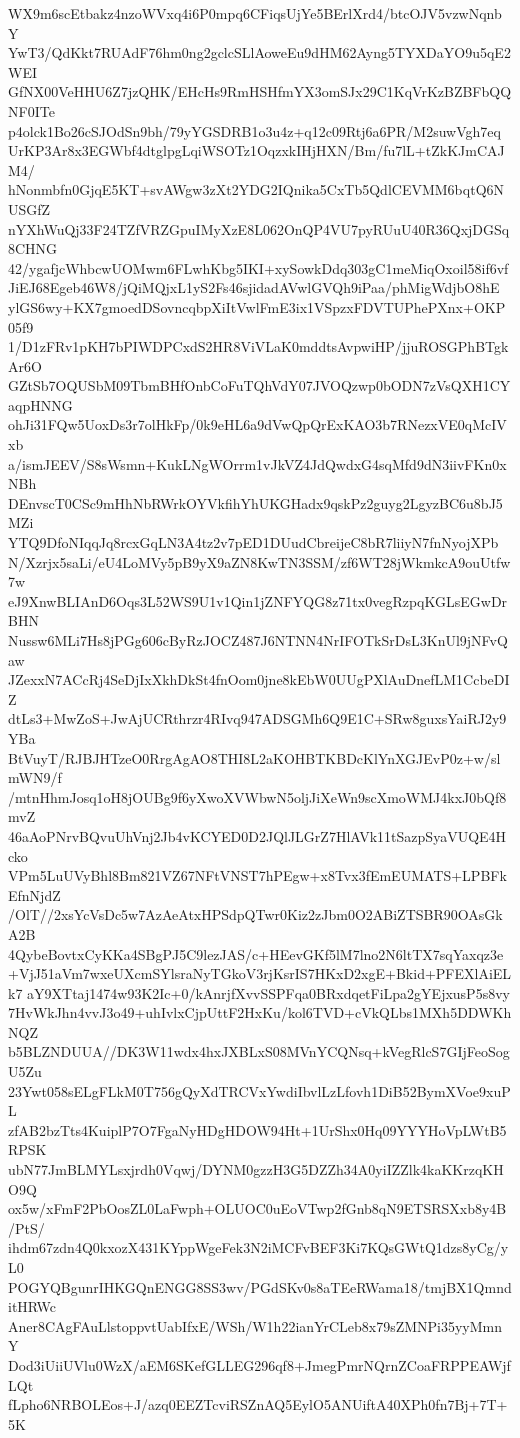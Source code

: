 WX9m6scEtbakz4nzoWVxq4i6P0mpq6CFiqsUjYe5BErlXrd4/btcOJV5vzwNqnbY
YwT3/QdKkt7RUAdF76hm0ng2gclcSLlAoweEu9dHM62Ayng5TYXDaYO9u5qE2WEI
GfNX00VeHHU6Z7jzQHK/EHcHs9RmHSHfmYX3omSJx29C1KqVrKzBZBFbQQNF0ITe
p4olck1Bo26cSJOdSn9bh/79yYGSDRB1o3u4z+q12c09Rtj6a6PR/M2suwVgh7eq
UrKP3Ar8x3EGWbf4dtglpgLqiWSOTz1OqzxkIHjHXN/Bm/fu7lL+tZkKJmCAJM4/
hNonmbfn0GjqE5KT+svAWgw3zXt2YDG2IQnika5CxTb5QdlCEVMM6bqtQ6NUSGfZ
nYXhWuQj33F24TZfVRZGpuIMyXzE8L062OnQP4VU7pyRUuU40R36QxjDGSq8CHNG
42/ygafjcWhbcwUOMwm6FLwhKbg5IKI+xySowkDdq303gC1meMiqOxoil58if6vf
JiEJ68Egeb46W8/jQiMQjxL1yS2Fs46sjidadAVwlGVQh9iPaa/phMigWdjbO8hE
ylGS6wy+KX7gmoedDSovncqbpXiItVwlFmE3ix1VSpzxFDVTUPhePXnx+OKP05f9
1/D1zFRv1pKH7bPIWDPCxdS2HR8ViVLaK0mddtsAvpwiHP/jjuROSGPhBTgkAr6O
GZtSb7OQUSbM09TbmBHfOnbCoFuTQhVdY07JVOQzwp0bODN7zVsQXH1CYaqpHNNG
ohJi31FQw5UoxDs3r7olHkFp/0k9eHL6a9dVwQpQrExKAO3b7RNezxVE0qMcIVxb
a/ismJEEV/S8sWsmn+KukLNgWOrrm1vJkVZ4JdQwdxG4sqMfd9dN3iivFKn0xNBh
DEnvscT0CSc9mHhNbRWrkOYVkfihYhUKGHadx9qskPz2guyg2LgyzBC6u8bJ5MZi
YTQ9DfoNIqqJq8rcxGqLN3A4tz2v7pED1DUudCbreijeC8bR7liiyN7fnNyojXPb
N/Xzrjx5saLi/eU4LoMVy5pB9yX9aZN8KwTN3SSM/zf6WT28jWkmkcA9ouUtfw7w
eJ9XnwBLIAnD6Oqs3L52WS9U1v1Qin1jZNFYQG8z71tx0vegRzpqKGLsEGwDrBHN
Nussw6MLi7Hs8jPGg606cByRzJOCZ487J6NTNN4NrIFOTkSrDsL3KnUl9jNFvQaw
JZexxN7ACcRj4SeDjIxXkhDkSt4fnOom0jne8kEbW0UUgPXlAuDnefLM1CcbeDIZ
dtLs3+MwZoS+JwAjUCRthrzr4RIvq947ADSGMh6Q9E1C+SRw8guxsYaiRJ2y9YBa
BtVuyT/RJBJHTzeO0RrgAgAO8THI8L2aKOHBTKBDcKlYnXGJEvP0z+w/slmWN9/f
/mtnHhmJosq1oH8jOUBg9f6yXwoXVWbwN5oljJiXeWn9scXmoWMJ4kxJ0bQf8mvZ
46aAoPNrvBQvuUhVnj2Jb4vKCYED0D2JQlJLGrZ7HlAVk11tSazpSyaVUQE4Hcko
VPm5LuUVyBhl8Bm821VZ67NFtVNST7hPEgw+x8Tvx3fEmEUMATS+LPBFkEfnNjdZ
/OlT//2xsYcVsDc5w7AzAeAtxHPSdpQTwr0Kiz2zJbm0O2ABiZTSBR90OAsGkA2B
4QybeBovtxCyKKa4SBgPJ5C9lezJAS/c+HEevGKf5lM7lno2N6ltTX7sqYaxqz3e
+VjJ51aVm7wxeUXcmSYlsraNyTGkoV3rjKsrIS7HKxD2xgE+Bkid+PFEXlAiELk7
aY9XTtaj1474w93K2Ic+0/kAnrjfXvvSSPFqa0BRxdqetFiLpa2gYEjxusP5s8vy
7HvWkJhn4vvJ3o49+uhIvlxCjpUttF2HxKu/kol6TVD+cVkQLbs1MXh5DDWKhNQZ
b5BLZNDUUA//DK3W11wdx4hxJXBLxS08MVnYCQNsq+kVegRlcS7GIjFeoSogU5Zu
23Ywt058sELgFLkM0T756gQyXdTRCVxYwdiIbvlLzLfovh1DiB52BymXVoe9xuPL
zfAB2bzTts4KuiplP7O7FgaNyHDgHDOW94Ht+1UrShx0Hq09YYYHoVpLWtB5RPSK
ubN77JmBLMYLsxjrdh0Vqwj/DYNM0gzzH3G5DZZh34A0yiIZZlk4kaKKrzqKHO9Q
ox5w/xFmF2PbOosZL0LaFwph+OLUOC0uEoVTwp2fGnb8qN9ETSRSXxb8y4B/PtS/
ihdm67zdn4Q0kxozX431KYppWgeFek3N2iMCFvBEF3Ki7KQsGWtQ1dzs8yCg/yL0
POGYQBgunrIHKGQnENGG8SS3wv/PGdSKv0s8aTEeRWama18/tmjBX1QmnditHRWc
Aner8CAgFAuLlstoppvtUabIfxE/WSh/W1h22ianYrCLeb8x79sZMNPi35yyMmnY
Dod3iUiiUVlu0WzX/aEM6SKefGLLEG296qf8+JmegPmrNQrnZCoaFRPPEAWjfLQt
fLpho6NRBOLEos+J/azq0EEZTcviRSZnAQ5EylO5ANUiftA40XPh0fn7Bj+7T+5K

